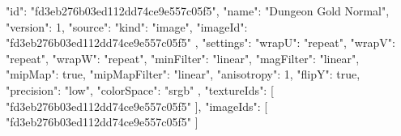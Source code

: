 {
  "id": "fd3eb276b03ed112dd74ce9e557c05f5",
  "name": "Dungeon Gold Normal",
  "version": 1,
  "source": {
    "kind": "image",
    "imageId": "fd3eb276b03ed112dd74ce9e557c05f5"
  },
  "settings": {
    "wrapU": "repeat",
    "wrapV": "repeat",
    "wrapW": "repeat",
    "minFilter": "linear",
    "magFilter": "linear",
    "mipMap": true,
    "mipMapFilter": "linear",
    "anisotropy": 1,
    "flipY": true,
    "precision": "low",
    "colorSpace": "srgb"
  },
  "textureIds": [
    "fd3eb276b03ed112dd74ce9e557c05f5"
  ],
  "imageIds": [
    "fd3eb276b03ed112dd74ce9e557c05f5"
  ]
}
